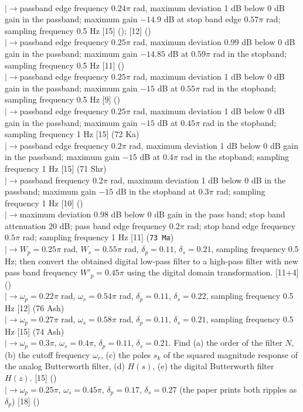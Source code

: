 \documentclass[12pt]{article}
\newcommand{\lb}{\\$\left|\rightarrow\right.$}
\begin{document}
\begin{enumerate}[topsep=0pt, noitemsep]
        \lb passband edge frequency $0.24\pi$ rad, maximum deviation 1 dB below 0 dB gain in the passband; maximum gain $-14.9$ dB at stop band edge $0.57\pi$ rad; sampling frequency 0.5 Hz \hfill [15] (); [12] ()
        \lb passband edge frequency $0.25\pi$ rad, maximum deviation $0.99$ dB below 0 dB gain in the passband; maximum gain $-14.85$ dB at $0.59\pi$ rad in the stopband; sampling frequency 0.5 Hz \hfill [11] ()
        \lb passband edge frequency $0.25\pi$ rad, maximum deviation 1 dB below 0 dB gain in the passband; maximum gain $-15$ dB at $0.55\pi$ rad in the stopband; sampling frequency 0.5 Hz \hfill [9] ()
        \lb passband edge frequency $0.25\pi$ rad, maximum deviation 1 dB below 0 dB gain in the passband; maximum gain $-15$ dB at $0.45\pi$ rad in the stopband; sampling frequency 1 Hz \hfill [15] (72 Ka)
        \lb passband edge frequency $0.2\pi$ rad, maximum deviation 1 dB below 0 dB gain in the passband; maximum gain $-15$ dB at $0.4\pi$ rad in the stopband; sampling frequency 1 Hz \hfill [15] (71 Shr)
        \lb passband frequency $0.2\pi$ rad, maximum deviation 1 dB below 0 dB in the passband; maximum gain $-15$ dB in the stopband at $0.3\pi$ rad; sampling frequency 1 Hz \hfill [10] ()
        \lb maximum deviation $0.98$ dB below 0 dB gain in the pass band; stop band attenuation 20 dB; pass band edge frequency $0.2\pi$ rad; stop band edge frequency $0.5\pi$ rad; sampling frequency 1 Hz \hfill [11] (\texttt{73 Ma})
        \lb $W_p=0.25\pi$ rad, $W_s=0.55\pi$ rad, $\delta_p=0.11$, $\delta_s=0.21$, sampling frequency 0.5 Hz; then convert the obtained digital low-pass filter to a high-pass filter with new pass band frequency $W'_p=0.45\pi$ using the digital domain transformation. \hfill [11+4] ()
        \lb $\omega_p=0.22\pi$ rad, $\omega_s=0.54\pi$ rad, $\delta_p=0.11$, $\delta_s=0.22$, sampling frequency 0.5 Hz \hfill [12] (76 Ash)
        \lb $\omega_p=0.27\pi$ rad, $\omega_s=0.58\pi$ rad, $\delta_p=0.11$, $\delta_s=0.21$, sampling frequency 0.5 Hz \hfill [15] (74 Ash)
        \lb $\omega_p=0.3\pi$, $\omega_s=0.4\pi$, $\delta_p=0.11$, $\delta_s=0.21$. Find (a) the order of the filter $N$, (b) the cutoff frequency $\omega_c$, (c) the poles $s_k$ of the squared magnitude response of the analog Butterworth filter, (d) $H(s)$, (e) the digital Butterworth filter $H(z)$. \hfill [15] ()
        \lb $\omega_p=0.25\pi$, $\omega_s=0.45\pi$, $\delta_p=0.17$, $\delta_s=0.27$ (the paper prints both ripples as $\delta_p$) \hfill [18] ()

\end{enumerate}
\end{document}
